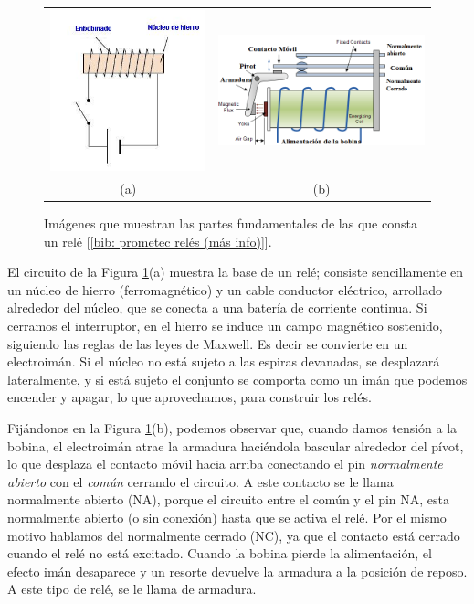 \documentclass[12pt]{article}
\begin{document}
	\begin{figure}
		\begin{center}
			\begin{tabular}{cc}
				\includegraphics[width=60mm]{img/rele_1.png} &   \includegraphics[width=80mm]{img/rele_2.png} \\
				(a)  & (b)  \\[6pt]
			\end{tabular}
			\caption{Imágenes que muestran las partes fundamentales de las que consta un relé [\ref{bib: prometec relés (más info)}].}
			\label{Rele: teoria}
		\end{center}
	\end{figure}

	\noindent El circuito de la Figura \ref{Rele: teoria}(a) muestra la base de un relé; consiste sencillamente en un núcleo de hierro (ferromagnético) y un cable conductor eléctrico, arrollado alrededor del núcleo, que se conecta a una batería de corriente continua. Si cerramos el interruptor, en el hierro se induce un campo  magnético sostenido, siguiendo las reglas de las leyes de Maxwell. Es decir se convierte en un electroimán. Si el núcleo no está sujeto a las espiras devanadas, se desplazará lateralmente, y si está sujeto el conjunto se comporta como un imán que podemos encender y apagar, lo que aprovechamos, para construir los relés.
	
	\noindent Fijándonos en la Figura \ref{Rele: teoria}(b), podemos observar que, cuando damos tensión a la bobina, el electroimán atrae la armadura haciéndola bascular alrededor del pívot, lo que desplaza el contacto móvil hacia arriba conectando el pin \textit{normalmente abierto} con el \textit{común} cerrando el circuito. A este contacto se le llama normalmente abierto (NA), porque el circuito entre el común y el pin NA, esta normalmente abierto (o sin conexión) hasta que se activa el relé. Por el mismo motivo hablamos del normalmente cerrado (NC), ya que el contacto está cerrado cuando el relé no está excitado. Cuando la bobina pierde la alimentación, el efecto imán desaparece y un resorte devuelve la armadura a la posición de reposo. A este tipo de relé, se le llama de armadura.
	
\end{document}
